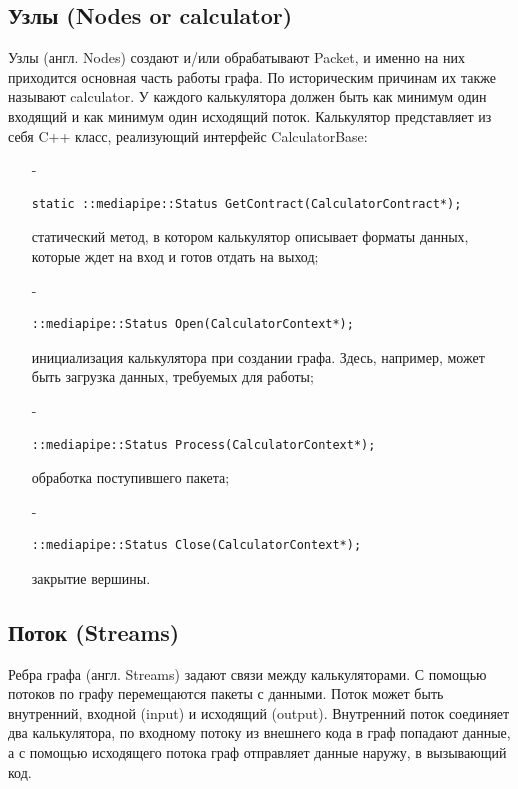 \documentclass[a4paper,14pt]{extreport}
\begin{document}
        \subsection{Узлы (Nodes or calculator)}
        Узлы (англ. Nodes) создают и/или обрабатывают Packet, и именно на них приходится основная часть работы графа. По историческим причинам их также называют calculator. У каждого калькулятора должен быть как минимум один входящий и как минимум один исходящий поток. Калькулятор представляет из себя C++ класс, реализующий интерфейс CalculatorBase:
        \begin{itemize}
          \item[-] \begin{verbatim}static ::mediapipe::Status GetContract(CalculatorContract*);\end{verbatim} статический метод, в котором калькулятор описывает форматы данных, которые ждет на вход и готов отдать на выход;
          
          \item[-] \begin{verbatim}::mediapipe::Status Open(CalculatorContext*);\end{verbatim} инициализация калькулятора при создании графа. Здесь, например, может быть загрузка данных, требуемых для работы;
          
          \item[-] \begin{verbatim}::mediapipe::Status Process(CalculatorContext*);\end{verbatim} обработка поступившего пакета;
          
          \item[-] \begin{verbatim}::mediapipe::Status Close(CalculatorContext*);\end{verbatim} 
           закрытие вершины.
        \end{itemize}
        
        \subsection{Поток (Streams)}
        Ребра графа (англ. Streams) задают связи между калькуляторами. С помощью потоков по графу перемещаются пакеты с данными. Поток может быть внутренний, входной (input) и исходящий (output). Внутренний поток соединяет два калькулятора, по входному потоку из внешнего кода в граф попадают данные, а с помощью исходящего потока граф отправляет данные наружу, в вызывающий код.
\end{document}
